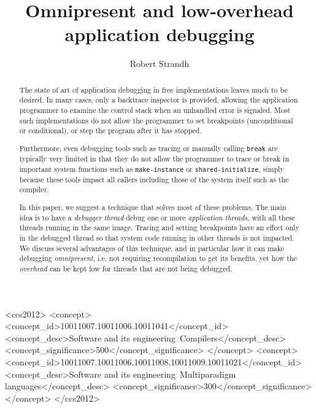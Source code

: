 \documentclass[format=sigconf]{acmart}
\begin{document}
\title{Omnipresent and low-overhead application debugging}

\author{Robert Strandh}


\begin{abstract}
The state of art of application debugging in free \commonlisp{}
implementations leaves much to be desired.  In many cases, only a
backtrace inspector is provided, allowing the application programmer
to examine the control stack when an unhandled error is signaled.
Most such implementations do not allow the programmer to set
breakpoints (unconditional or conditional), or step the program after
it has stopped.

Furthermore, even debugging tools such as tracing or manually calling
\texttt{break} are typically very limited in that they do not allow
the programmer to trace or break in important system functions such as
\texttt{make-instance} or \texttt{shared-initialize}, simply because
these tools impact all callers including those of the system itself
such as the compiler.

In this paper, we suggest a technique that solves most of these
problems.  The main idea is to have a \emph{debugger thread} debug one
or more \emph{application threads}, with all these threads running in
the same image.  Tracing and setting breakpoints have an effect only
in the debugged thread so that system code running in other threads is
not impacted.  We discuss several advantages of this technique, and in
particular how it can make debugging \emph{omnipresent}, i.e. not
requiring recompilation to get its benefits, yet how the
\emph{overhead} can be kept low for threads that are not being
debugged.
\end{abstract}

\begin{CCSXML}
<ccs2012>
<concept>
<concept_id>10011007.10011006.10011041</concept_id>
<concept_desc>Software and its engineering~Compilers</concept_desc>
<concept_significance>500</concept_significance>
</concept>
<concept>
<concept_id>10011007.10011006.10011008.10011009.10011021</concept_id>
<concept_desc>Software and its engineering~Multiparadigm languages</concept_desc>
<concept_significance>300</concept_significance>
</concept>
</ccs2012>
\end{CCSXML}

\end{document}
